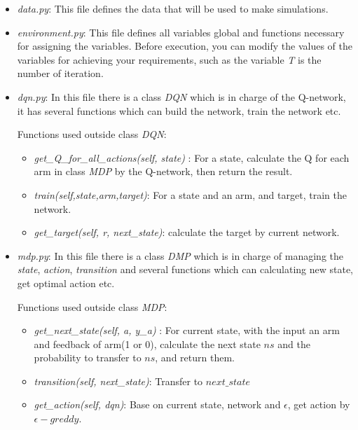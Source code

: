\documentclass[a4paper,10pt]{article}
\begin{document}
\begin{itemize}
\item \textit{data.py}: This file defines the data that will be used to make simulations.

\item \textit{environment.py}: This file defines all variables global and functions necessary for assigning the variables. Before execution, you can modify the values of the variables for achieving your requirements, such as the variable \textit{T} is the number of iteration.

\item \textit{dqn.py}: In this file there is a class \textit{DQN} which is in charge of the Q-network, it has several functions which can build the network, train the network etc.

Functions used outside class \textit{DQN}:


\begin{itemize}
\item \textit{get\_Q\_for\_all\_actions(self, state)} : For a state, calculate the Q for each arm in class \textit{MDP} by the Q-network, then return the result.

\item \textit{train(self,state,arm,target)}: For a state and an arm, and target, train the network.

\item \textit{get\_target(self, r, next\_state)}: calculate the target by current network.
\end{itemize}

\item \textit{mdp.py}: In this file there is a class \textit{DMP} which is in charge of managing the \textit{state}, \textit{action}, \textit{transition} and several functions which can calculating new state, get optimal action etc.

Functions used outside class \textit{MDP}:

\begin{itemize}
\item \textit{get\_next\_state(self, a, y\_a)} : For current state, with the input an arm and feedback of arm(1 or 0), calculate the next state $ns$  and the probability to transfer to $ns$, and return them.

\item \textit{transition(self, next\_state)}: Transfer to $next\_state$

\item \textit{get\_action(self, dqn)}: Base on current state, network and $\epsilon$, get action by $\epsilon-greddy$.


\end{itemize}
\end{itemize}
\end{document}
